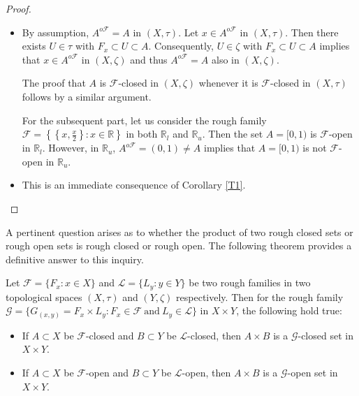 \documentclass[11pt]{amsart}
\begin{document}
\begin{proof}
\begin{itemize}
    \item[(i)] By assumption, $A^{o\mathscr{F}}=A$ in $(X,\tau)$. Let $x\in A^{o\mathscr{F}}$ in $(X,\tau)$. Then there exists $U\in \tau$ with $F_x\subset U\subset A$. Consequently, $U\in \zeta$ with $F_x\subset U\subset A$ implies that $x\in A^{o\mathscr{F}}$ in $(X,\zeta)$ and thus $A^{o\mathscr{F}}=A$ also in $(X,\zeta)$.

    The proof that $A$ is $\mathscr{F}$-closed in $(X, \zeta)$ whenever it is $\mathscr{F}$-closed in $(X, \tau)$ follows by a similar argument.

    For the subsequent part, let us consider the rough family $\mathscr{F}=\left\{\left\{x,\frac{x}{2}\right\}: x\in \mathbb{R}\right\}$ in both $\mathbb{R}_l$ and $\mathbb{R}_u$. Then the set $A=[0,1)$ is $\mathscr{F}$-open in $\mathbb{R}_l$. However, in $\mathbb{R}_u$, $A^{o\mathscr{F}}=(0,1)\neq A$ implies that $A=[0,1)$ is not $\mathscr{F}$-open in $\mathbb{R}_u$.

    \item[(ii)] This is an immediate consequence of Corollary \ref{T1}. 
\end{itemize}
\end{proof}


A pertinent question arises as to whether the product of two rough closed sets or rough open sets is rough closed or rough open. The following theorem provides a definitive answer to this inquiry.

\begin{theorem}
     Let $\mathscr{F}=\{F_x: x\in X\}$ and $\mathscr{L}=\{L_y: y\in Y\}$ be two rough families in two topological spaces \((X,\tau)\) and \((Y,\zeta)\) respectively. Then for the rough family $\mathcal{G}=\{G_{(x,y)}=F_x\times L_y: F_x\in\mathscr{F}~\text{and}~L_y\in \mathscr{L}\}$ in $X\times Y$, the following hold true:
    \begin{itemize}
        \item[(i)] If $A\subset X$ be $\mathscr{F}$-closed and $B\subset Y$ be $\mathscr{L}$-closed, then $A\times B$ is a $\mathcal{G}$-closed set in $X\times Y$.
        \item[(ii)] If $A\subset X$ be $\mathscr{F}$-open and $B\subset Y$ be $\mathscr{L}$-open, then $A\times B$ is a $\mathcal{G}$-open set in $X\times Y$. 
    \end{itemize}
\end{theorem}
\end{document}
